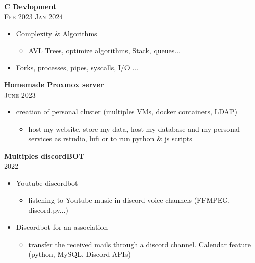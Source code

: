 \documentclass[oneside]{article}
\begin{document}
{\begin{minipage}[t][\dimexpr\textheight-2\fboxrule-2\fboxsep\relax][t]{\dimexpr0.65\textwidth-2\fboxrule-2\fboxsep\relax}
        {\large \textbf{C Devlopment}} \\
        {\scshape{}\selectfont\footnotesize Feb 2023 \textendash{} Jan 2024} 
        \begin{itemize}
            \setlength{\itemsep}{-3pt}
            \item Complexity \& Algorithms
            \begin{itemize}
                \item  AVL Trees, optimize algorithms, Stack, queues...
            \end{itemize}
            \item  Forks, processes, pipes, syscalls, I/O ...
        \end{itemize}

        {\large \textbf{Homemade Proxmox server}} \\
        {\scshape{}\selectfont\footnotesize June 2023} 
        \begin{itemize}
            \setlength{\itemsep}{-3pt}
            \item creation of personal cluster (multiples VMs, docker containers, LDAP)
            \begin{itemize}
                \item  host my website, store my data, host my database and my personal services as rstudio, lufi or to run python & js scripts 
            \end{itemize}
        \end{itemize}

        {\large \textbf{Multiples discordBOT}} \\
        {\scshape{}\selectfont\footnotesize 2022} 
        \begin{itemize}
            \setlength{\itemsep}{-3pt}
            \item Youtube discordbot
            \begin{itemize}
                \item  listening to Youtube music in discord voice channels (FFMPEG, discord.py...)
            \end{itemize}
            \item Discordbot for an association 
            \begin{itemize}
                \item  transfer the received mails through a discord channel. Calendar feature (python, MySQL, Discord APIs)
            \end{itemize}
            
        \end{itemize}



      
        \vfill%
    \end{minipage}
}%
\end{document}
